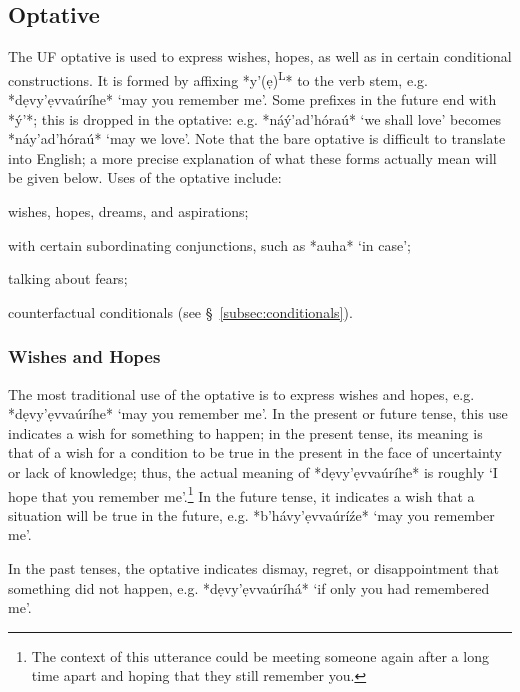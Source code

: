 \documentclass[a4paper, 12pt, oneside, final]{article}
\newlength{\EnumItemSep} \EnumItemSep-3pt
\newenvironment { enum } [1] [0] {
    \vspace { -.5em }
    \settowidth \leftmargini { 99.\hskip\labelsep }
    \begin { enumerate }
    \setcounter { enumi } { #1 }
    \itemsep \EnumItemSep
} {
    \end { enumerate }
    \vspace { -.5em }
}
\def \L {\textsuperscript{L}}
\begin{document}
\subsection{Optative}\label{subsec:optative}
The UF optative is used to express wishes, hopes, as well as in certain conditional constructions. It is formed
by affixing *y’(ẹ)\L* to the verb stem, e.g. *dẹvy’ẹvvaúríhe* ‘may you remember me’. Some prefixes in the future end with
*ý’*; this is dropped in the optative: e.g. *náý’ad’hóraú* ‘we shall love’ becomes *náy’ad’hóraú* ‘may we love’. Note
that the bare optative is difficult to translate into English; a more precise explanation of what these forms actually
mean will be given below. Uses of the optative include:
\begin{enum}
\item wishes, hopes, dreams, and aspirations;
\item with certain subordinating conjunctions, such as *auha* ‘in case’;
\item talking about fears;
\item counterfactual conditionals (see §~\ref{subsec:conditionals}).
\end{enum}

\subsubsection{Wishes and Hopes}
The most traditional use of the optative is to express wishes and hopes, e.g. *dẹvy’ẹvvaúríhe* ‘may you remember me’. In
the present or future tense, this use indicates a wish for something to happen; in the present tense, its meaning is
that of a wish for a condition to be true in the present in the face of uncertainty or lack of knowledge; thus, the
actual meaning of *dẹvy’ẹvvaúríhe* is roughly ‘I hope that you remember me’.\footnote{The context of this utterance could be
meeting someone again after a long time apart and hoping that they still remember you.} In the future tense, it indicates a wish
that a situation will be true in the future, e.g. *b’hávy’ẹvvaúríźe* ‘may you remember me’.

In the past tenses, the optative indicates dismay, regret, or disappointment that something did not happen, e.g.
 *dẹvy’ẹvvaúríhá* ‘if only you had remembered me’.
\end{document}
